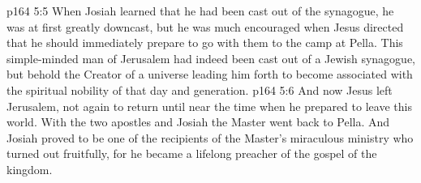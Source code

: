 \vs p164 5:5 When Josiah learned that he had been cast out of the synagogue, he was at first greatly downcast, but he was much encouraged when Jesus directed that he should immediately prepare to go with them to the camp at Pella. This simple\hyp{}minded man of Jerusalem had indeed been cast out of a Jewish synagogue, but behold the Creator of a universe leading him forth to become associated with the spiritual nobility of that day and generation.
\vs p164 5:6 And now Jesus left Jerusalem, not again to return until near the time when he prepared to leave this world. With the two apostles and Josiah the Master went back to Pella. And Josiah proved to be one of the recipients of the Master’s miraculous ministry who turned out fruitfully, for he became a lifelong preacher of the gospel of the kingdom.
\quizlink
